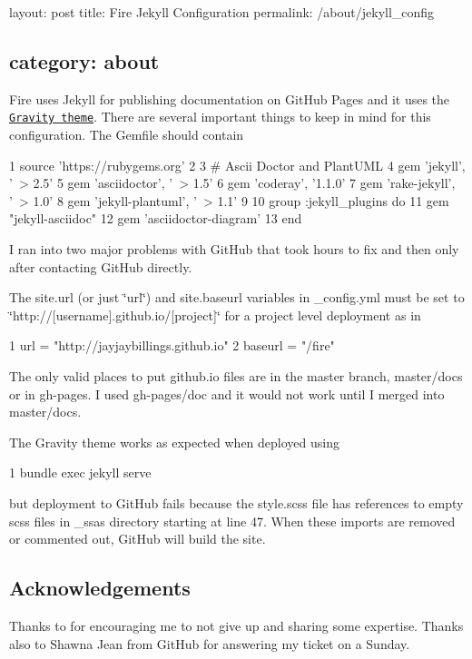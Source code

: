 

 layout\+: post title\+: Fire Jekyll Configuration permalink\+: /about/jekyll\+\_\+config \subsection*{category\+: about }

Fire uses Jekyll for publishing documentation on Git\+Hub Pages and it uses the \href{http://hemangsk.github.io/Gravity/}{\tt Gravity theme}. There are several important things to keep in mind for this configuration. The Gemfile should contain


\begin{DoxyCode}
1 source 'https://rubygems.org'
2 
3 # Ascii Doctor and PlantUML
4 gem 'jekyll', '~> 2.5'
5 gem 'asciidoctor', '~> 1.5'
6 gem 'coderay', '1.1.0'
7 gem 'rake-jekyll', '~> 1.0'
8 gem 'jekyll-plantuml', '~> 1.1' 
9 
10 group :jekyll\_plugins do
11   gem "jekyll-asciidoc"
12   gem 'asciidoctor-diagram' 
13 end
\end{DoxyCode}


I ran into two major problems with Git\+Hub that took hours to fix and then only after contacting Git\+Hub directly.


\begin{DoxyItemize}
\item The site.\+url (or just \char`\"{}url\char`\"{}) and site.\+baseurl variables in \+\_\+config.\+yml must be set to \char`\"{}http\+://\mbox{[}username\mbox{]}.\+github.\+io/\mbox{[}project\mbox{]}\char`\"{} for a project level deployment as in
\end{DoxyItemize}


\begin{DoxyCode}
1 url = "http://jayjaybillings.github.io"
2 baseurl = "/fire"
\end{DoxyCode}



\begin{DoxyItemize}
\item The only valid places to put github.\+io files are in the master branch, master/docs or in gh-\/pages. I used gh-\/pages/doc and it would not work until I merged into master/docs.
\end{DoxyItemize}

The Gravity theme works as expected when deployed using


\begin{DoxyCode}
1 bundle exec jekyll serve
\end{DoxyCode}


but deployment to Git\+Hub fails because the style.\+scss file has references to empty scss files in \+\_\+ssas directory starting at line 47. When these imports are removed or commented out, Git\+Hub will build the site.

\subsection*{Acknowledgements }

Thanks to  for encouraging me to not give up and sharing some expertise. Thanks also to Shawna Jean from Git\+Hub for answering my ticket on a Sunday. 